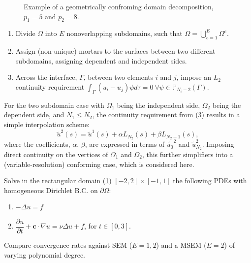 \documentclass[final,t]{beamer}
\begin{document}
\begin{frame}[fragile]{}
\begin{columns}[t]
\begin{column}{.45\linewidth}
\begin{tcolorbox}[toplevelbox,adjusted title=Approach]
\begin{figure}
\caption{\label{fig:domaindecomp} Example of a geometrically confroming domain decomposition, $p_1 = 5$ and $p_2 = 8$.}
      \end{figure}
\begin{enumerate}
\def\labelenumi{\arabic{enumi}.}
\item
  Divide \(\Omega\) into \(E\) nonoverlapping subdomains, such that
  \(\Omega=\bigcup_{e=1}^{E} \Omega ^e\).
\item
  Assign (non-unique) mortars to the surfaces between two different subdomains, assigning dependent and independent sides.
\item
  Across the interface, \(\Gamma\), between two elements \(i\) and
  \(j\), impose an \(L_2\) continuity requirement
  \(\int_{\Gamma}(u_i-u_j)\psi d\tau = 0\ \forall \psi \in \mathbb{P}_{N_i-2}(\Gamma)\).
\end{enumerate}

For the two subdomain case with \(\Omega_1\) being the independent side, \(\Omega_2\)
being the dependent side, and $N_1 \le N_2$, the continuity requirement from (3) results
in a simple interpolation scheme:
\begin{equation}
\tilde{u}^2(s) = \tilde{u}^1(s) + \alpha L_{N_2}(s) + \beta L_{N_2-1}(s) \nonumber ,
\end{equation}
where the coefficients, $\alpha$, $\beta$, are expressed in terms of $\tilde{u_0}^2$ and
$\tilde{u}_{N_2}^2$. Imposing direct continuity on the vertices of $\Omega_1$ and $\Omega_2$,
this further simplifiers into a (variable-resolution) conforming case, which is considered here.

      \end{tcolorbox}

      \begin{tcolorbox}[toplevelbox,adjusted title= Test Cases]
      Solve in the rectangular domain (\ref{fig:domaindecomp}) $[-2,2]\times[-1,1]$
      the following PDEs with homogeneous Dirichlet B.C. on $\partial\Omega$:
\begin{enumerate}
\item
$-\Delta u = f$
\item
$\dfrac{\partial u}{\partial t} + \boldsymbol{c} \cdot \nabla u = \nu \Delta u +f$, for $t\in[0,3]$.
\end{enumerate}
      Compare convergence rates against SEM ($E=1,2$)
      and a MSEM ($E=2$) of varying polynomial degree.
      \end{tcolorbox}
    \end{column}


\end{columns}
\end{frame}
\end{document}
